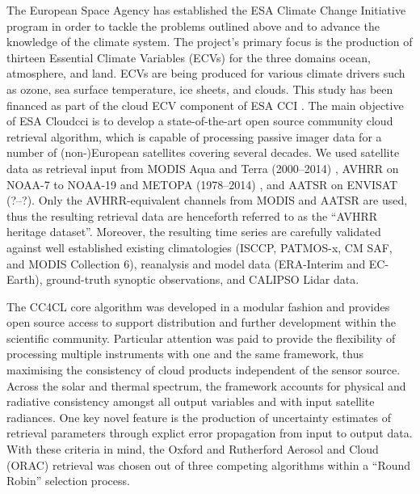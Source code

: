 \newpage

The European Space Agency has established the ESA Climate
Change Initiative program \citep{ESA_CCI_web,Hollmann13} in order to tackle
the problems outlined above and to advance the knowledge of the climate system.
The project's primary focus is the production of
thirteen Essential Climate Variables (ECVs) for the three domains ocean,
atmosphere, and land. ECVs are being produced for various climate drivers such as ozone, sea surface
temperature, ice sheets, and clouds. This study has been financed as part of the cloud ECV component of
ESA CCI \citep{ESA_Cloud_CCI_web}.
The main objective of ESA Cloud\textunderscore cci is to develop a state-of-the-art open source community
cloud retrieval algorithm, which is capable of processing passive imager data for a
number of \mbox{(non-)European} satellites covering several decades.
We used satellite data as retrieval input from MODIS Aqua and Terra (2000--2014) \citep{King92}, AVHRR on NOAA-7 to
NOAA-19 and METOPA (1978--2014) \citep{Jacobowitz03}, and AATSR on ENVISAT (?--?).
Only the AVHRR-equivalent channels from MODIS and AATSR are
used, thus the resulting retrieval data are henceforth referred to as the ``AVHRR heritage
dataset''. Moreover, the
resulting time series are carefully validated against well established existing climatologies (ISCCP, PATMOS-x, CM SAF, and MODIS
Collection 6), reanalysis and model data (ERA-Interim and EC-Earth),
ground-truth synoptic observations, and CALIPSO Lidar data.

The CC4CL core algorithm was developed in a modular fashion
and provides open source access to support distribution and further development within the
scientific community. Particular attention was paid to provide the flexibility of processing multiple instruments
with one and the same framework, thus maximising the consistency of
cloud products independent of the sensor source. Across the solar and thermal spectrum, the framework
accounts for physical and radiative consistency amongst all output variables and with
input satellite radiances. One key novel feature is the production of uncertainty
estimates of retrieval parameters through explict error propagation from input to output data. With these criteria in mind, the Oxford and Rutherford Aerosol and
Cloud (ORAC) retrieval \citep{Thomas09, Poulsen12} was chosen out of three competing algorithms within a ``Round Robin'' selection process. 

